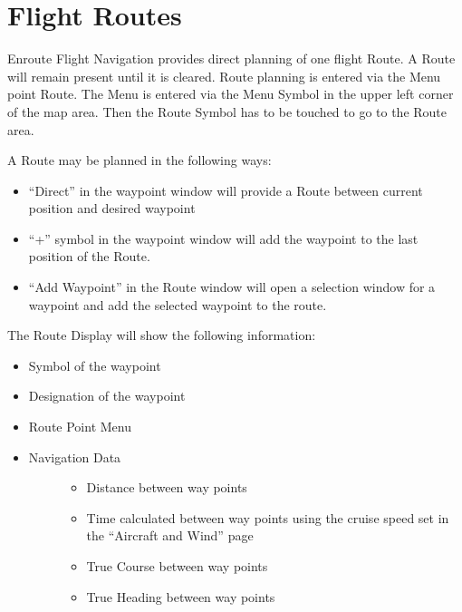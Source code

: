 \documentclass[letterpaper,10pt,english]{sphinxmanual}
\begin{document}
\section{Flight Routes}
\label{\detokenize{01-intro/further_steps:flight-routes}}
Enroute Flight Navigation provides direct planning of one flight Route. A Route will remain present until it is cleared.
Route planning is entered via the Menu point Route. The Menu is entered via the Menu Symbol in the upper left corner of the map area. Then the Route Symbol has to be touched to go to the Route area.

A Route may be planned in the following ways:
\begin{itemize}
\item {} 
“Direct” in the waypoint window will provide a Route between current position and desired waypoint

\item {} 
“+” symbol in the waypoint window will add the waypoint to the last position of the Route.

\item {} 
“Add Waypoint” in the Route window will open a selection window for a waypoint and add the selected waypoint to the route.

\end{itemize}

The Route Display will show the following information:
\begin{itemize}
\item {} 
Symbol of the waypoint

\item {} 
Designation of the waypoint

\item {} 
Route Point Menu

\item {} \begin{description}
\item[{Navigation Data}] \leavevmode\begin{itemize}
\item {} 
Distance between way points

\item {} 
Time calculated between way points using the cruise speed set in the “Aircraft and Wind” page

\item {} 
True Course between way points

\item {} 
True Heading between way points

\end{itemize}

\end{description}

\end{itemize}
\end{document}
